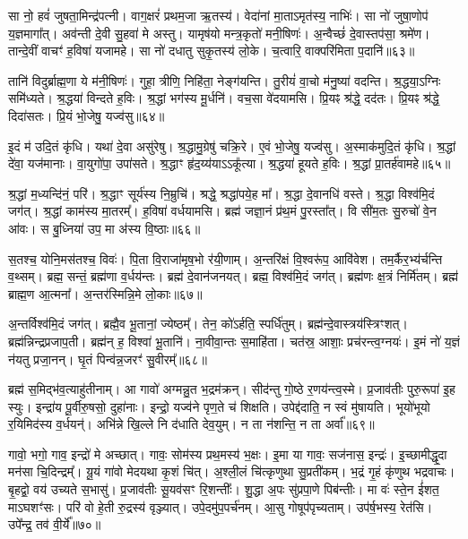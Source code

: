 सा नो॒ हवं॑ जुषता॒मिन्द्र॑पत्नी।
वाग॒क्षरं॑ प्रथम॒जा ऋ॒तस्य॑।
वेदा॑नां मा॒ता\-ऽमृत॑स्य॒ नाभिः॑।
सा नो॑ जुषा॒णोप॑ य॒ज्ञमागा᳚त्।
अव॑न्ती दे॒वी सु॒हवा॑ मे अस्तु।
यामृष॑यो मन्त्र॒कृतो॑ मनी॒षिणः॑।
अ॒न्वैच्छं॑ दे॒वास्तप॑सा॒ श्रमे॑ण।
तान्दे॒वीं वाचꣳ॑ ह॒विषा॑ यजामहे।
सा नो॑ दधातु सुकृ॒तस्य॑ लो॒के।
च॒त्वारि॒ वाक्परि॑मिता प॒दानि॑॥६३॥\ip

तानि॑ विदुर्ब्राह्म॒णा ये म॑नी॒षिणः॑।
गुहा॒ त्रीणि॒ निहि॑ता॒ नेङ्ग॑यन्ति।
तु॒रीयं॑ वा॒चो म॑नु॒ष्या॑ वदन्ति।
श्र॒द्धया॒\-ऽग्निः समि॑ध्यते।
श्र॒द्धया॑ विन्दते ह॒विः।
श्र॒द्धां भग॑स्य मू॒र्धनि॑।
वच॒सा वे॑दयामसि।
प्रि॒यꣴ श्र॑द्धे॒ दद॑तः।
प्रि॒यꣴ श्र॑द्धे॒ दिदा॑सतः।
प्रि॒यं भो॒जेषु॒ यज्व॑सु॥६४॥\ip

इ॒दं म॑ उदि॒तं कृ॑धि।
यथा॑ दे॒वा असु॑रेषु।
श्र॒द्धामु॒ग्रेषु॑ चक्रि॒रे।
ए॒वं भो॒जेषु॒ यज्व॑सु।
अ॒स्माक॑मुदि॒तं कृ॑धि।
श्र॒द्धां दे॑वा॒ यज॑मानाः।
वा॒युगो॑पा॒ उपा॑सते।
श्र॒द्धाꣳ हृ॑द॒य्य॑या\-ऽऽकू᳚त्या।
श्र॒द्धया॑ हूयते ह॒विः।
श्र॒द्धां प्रा॒तर्\mbox{}ह॑वामहे॥६५॥\ip

श्र॒द्धां म॒ध्यन्दि॑नं॒ परि॑।
श्र॒द्धाꣳ सूर्य॑स्य नि॒म्रुचि॑।
श्रद्धे॒ श्रद्धा॑पये॒ह मा᳚।
श्र॒द्धा दे॒वानधि॑ वस्ते।
श्र॒द्धा विश्व॑मि॒दं जग॑त्।
श्र॒द्धां काम॑स्य मा॒तरम्᳚।
ह॒विषा॑ वर्धयामसि।
ब्रह्म॑ जज्ञा॒नं प्र॑थ॒मं पु॒रस्ता᳚त्।
वि सी॑म॒तः सु॒रुचो॑ वे॒न आ॑वः।
स बु॒ध्निया॑ उप॒ मा अ॑स्य वि॒ष्ठाः॥६६॥\ip

स॒तश्च॒ योनि॒मस॑तश्च॒ विवः॑।
पि॒ता वि॒राजा॑मृष॒भो र॑यी॒णाम्।
अ॒न्तरि॑क्षं वि॒श्वरू॑प॒ आवि॑वेश।
तम॒र्कैर॒भ्य॑र्चन्ति व॒थ्सम्।
ब्रह्म॒ सन्तं॒ ब्रह्म॑णा व॒र्धय॑न्तः।
ब्रह्म॑ दे॒वान॑जनयत्।
ब्रह्म॒ विश्व॑मि॒दं जग॑त्।
ब्रह्म॑णः क्ष॒त्रं निर्मि॑तम्।
ब्रह्म॑ ब्राह्म॒ण आ॒त्मना᳚।
अ॒न्तर॑स्मिन्नि॒मे लो॒काः॥६७॥\ip

अ॒न्तर्विश्व॑मि॒दं जग॑त्।
ब्रह्मै॒व भू॒तानां॒ ज्येष्ठम्᳚।
तेन॒ को॑\-ऽर्\mbox{}हति॒ स्पर्धि॑तुम्।
ब्रह्म॑न्दे॒वास्त्रय॑स्त्रिꣳशत्।
ब्रह्म॑न्निन्द्रप्रजाप॒ती।
ब्रह्म॑न् ह॒ विश्वा॑ भू॒तानि॑।
ना॒वीवा॒न्तः स॒माहि॑ता।
चत॑स्र॒ आशाः॒ प्रच॑रन्त्व॒ग्नयः॑।
इ॒मं नो॑ य॒ज्ञं न॑यतु प्रजा॒नन्।
घृ॒तं पिन्व॑न्न॒जरꣳ॑ सु॒वीरम्᳚॥६८॥\ip

ब्रह्म॑ स॒मिद्भ॑व॒त्याहु॑तीनाम्।
आ गावो॑ अग्मन्नु॒त भ॒द्रम॑क्रन्।
सीद॑न्तु गो॒ष्ठे र॒णय॑न्त्व॒स्मे।
प्र॒जाव॑तीः पुरु॒रूपा॑ इ॒ह स्युः।
इन्द्रा॑य पू॒र्वीरु॒षसो॒ दुहा॑नाः।
इन्द्रो॒ यज्व॑ने पृण॒ते च॑ शिक्षति।
उपेद्द॑दाति॒ न स्वं मु॑षायति।
भूयो॑भूयो र॒यिमिद॑स्य व॒र्धयन्॑।
अभि॑न्ने खि॒ल्ले नि द॑धाति देव॒युम्।
न ता न॑शन्ति॒ न ता अर्वा᳚॥६९॥\ip

गावो॒ भगो॒ गाव॒ इन्द्रो॑ मे अच्छात्।
गावः॒ सोम॑स्य प्रथ॒मस्य॑ भ॒क्षः।
इ॒मा या गावः॒ सज॑नास॒ इन्द्रः॑।
इ॒च्छामीद्धृ॒दा मन॑सा चि॒दिन्द्रम्᳚।
यू॒यं गा॑वो मेदयथा कृ॒शं चि॑त्।
अ॒श्ली॒लं चि॑त्कृणुथा सु॒प्रती॑कम्।
भ॒द्रं गृ॒हं कृ॑णुथ भद्रवाचः।
बृ॒हद्वो॒ वय॑ उच्यते स॒भासु॑।
प्र॒जाव॑तीः सू॒यव॑सꣳ रि॒शन्तीः᳚।
शु॒द्धा अ॒पः सु॑प्रपा॒णे पिब॑न्तीः।
मा वः॑ स्ते॒न ई॑शत॒ माऽघशꣳ॑सः।
परि॑ वो हे॒ती रु॒द्रस्य॑ वृञ्ज्यात्।
उपे॒दमु॑प॒पर्च॑नम्।
आ॒सु गोषूप॑पृच्यताम्।
उप॑र्\mbox{}ष॒भस्य॒ रेत॑सि।
उपे᳚न्द्र॒ तव॑ वी॒र्ये᳚॥७०॥\ip\anuvakamend[च॒रा॒मि॒ कनी॑यो॒\-ऽन्यानर्पि॑ता प॒दानि॒ यज्व॑सु हवामहे वि॒ष्ठा लो॒काः सु॒वीर॒मर्वा॒ पिब॑न्तीः॒ षट्च॑]

